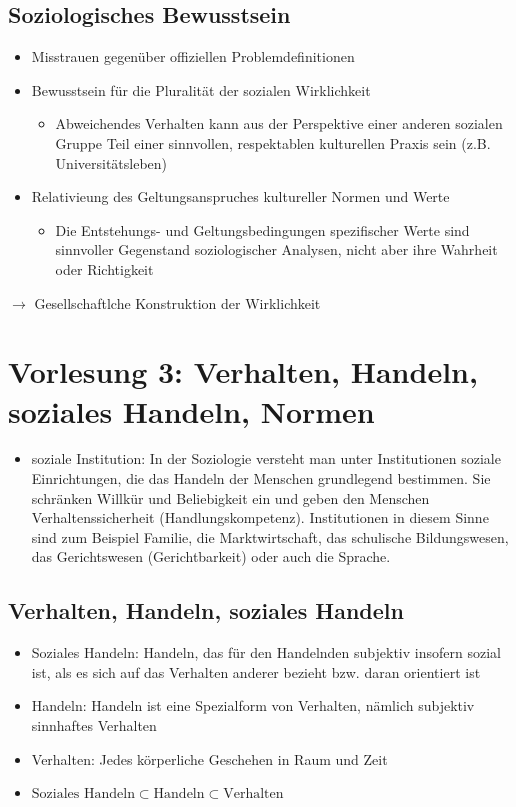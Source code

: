 \documentclass{scrartcl}
\begin{document}
\subsection*{Soziologisches Bewusstsein}
\begin{itemize}
    \item
        Misstrauen gegenüber offiziellen Problemdefinitionen
    \item
        Bewusstsein für die Pluralität der sozialen Wirklichkeit
        \begin{itemize}
            \item
                Abweichendes Verhalten kann aus der Perspektive einer anderen sozialen Gruppe Teil einer sinnvollen, respektablen kulturellen Praxis sein (z.B. Universitätsleben)
        \end{itemize}
    \item
        Relativieung des Geltungsanspruches kultureller Normen und Werte
        \begin{itemize}
            \item
                Die Entstehungs- und Geltungsbedingungen spezifischer Werte sind sinnvoller Gegenstand soziologischer Analysen, nicht aber ihre Wahrheit oder Richtigkeit
        \end{itemize}
\end{itemize}
$\rightarrow$ Gesellschaftlche Konstruktion der Wirklichkeit

\newpage

\section*{Vorlesung 3: Verhalten, Handeln, soziales Handeln, Normen}
\begin{itemize}
    \item
        soziale Institution: In der Soziologie versteht man unter Institutionen soziale Einrichtungen, die das Handeln der Menschen grundlegend bestimmen. Sie schränken Willkür und Beliebigkeit ein und geben den Menschen Verhaltenssicherheit (Handlungskompetenz). Institutionen in diesem Sinne sind zum Beispiel Familie, die Marktwirtschaft, das schulische Bildungswesen, das Gerichtswesen (Gerichtbarkeit) oder auch die Sprache.
\end{itemize}
\subsection*{Verhalten, Handeln, soziales Handeln}
\begin{itemize}
    \item
        Soziales Handeln: Handeln, das für den Handelnden subjektiv insofern sozial ist, als es sich auf das Verhalten anderer bezieht bzw. daran orientiert ist
    \item
        Handeln: Handeln ist eine Spezialform von Verhalten, nämlich subjektiv sinnhaftes Verhalten
    \item
        Verhalten: Jedes körperliche Geschehen in Raum und Zeit
    \item
        $\text{Soziales Handeln} \subset \text{Handeln} \subset \text{Verhalten}$
\end{itemize}
\end{document}
